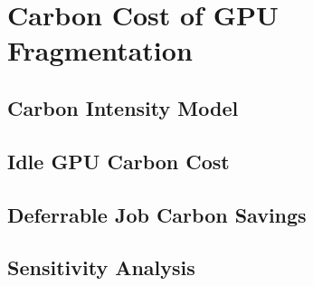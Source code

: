 \section{Carbon Cost of GPU Fragmentation}
\label{sec:carbon}


\subsection{Carbon Intensity Model}
\label{sec:carbon:model}


\subsection{Idle GPU Carbon Cost}
\label{sec:carbon:idle}


\subsection{Deferrable Job Carbon Savings}
\label{sec:carbon:deferrable}


\subsection{Sensitivity Analysis}
\label{sec:carbon:sensitivity}

